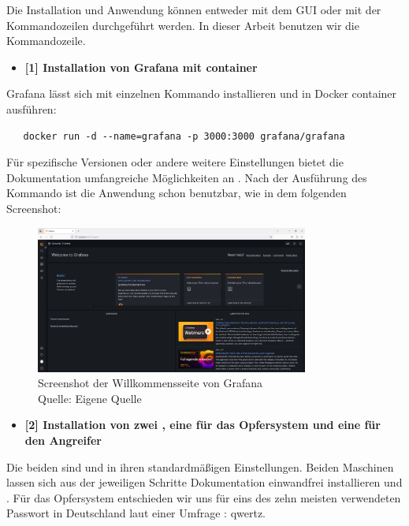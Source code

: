 Die Installation und Anwendung können entweder mit dem \gls{GUI} oder mit der Kommandozeilen durchgeführt werden. In dieser Arbeit benutzen wir die Kommandozeile. 

\begin{itemize}[noitemsep]
   \item \textbf{[1] Installation von Grafana mit \gls{container}}
\end{itemize}

Grafana lässt sich mit einzelnen Kommando installieren und in Docker \gls{container} ausführen:

\begin{verbatim}
   docker run -d --name=grafana -p 3000:3000 grafana/grafana
\end{verbatim}

Für spezifische Versionen oder andere weitere Einstellungen bietet die Dokumentation  umfangreiche Möglichkeiten an \citep{Grafana_run}. Nach der Ausführung des Kommando ist die Anwendung schon benutzbar, wie in dem folgenden Screenshot:

\begin{figure}[H]
   \centering
   \includegraphics[width=0.8\textwidth]{assets/Installation_Grafana.png}
   \caption{Screenshot der Willkommensseite von Grafana\\Quelle: Eigene Quelle \citep{Grafana_Logs}}
   \centering
\end{figure}

\begin{itemize}[noitemsep]
   \item	\textbf{[2] Installation von zwei , eine für das Opfersystem und eine für den Angreifer}
\end{itemize}

Die beiden  sind  und  in ihren standardmäßigen Einstellungen. Beiden Maschinen lassen sich aus der jeweiligen Schritte Dokumentation einwandfrei installieren \citep{kali_vm} und \citep{Ubuntu_server}. Für das Opfersystem entschieden wir uns für eins des zehn meisten verwendeten Passwort in Deutschland laut einer Umfrage \citep{silicon_passwort}: qwertz.  

